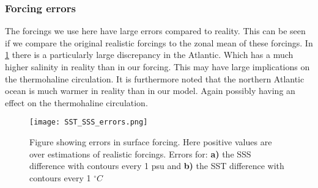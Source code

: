 \begin{multicols}{2}
 \subsubsection{Forcing errors} \label{sec:forc_err}
The forcings we use here have large errors compared to reality. This can be seen if we compare the original realistic forcings to the zonal mean of these forcings. In \cref{fig:sss_sst_errors} there is a particularly large discrepancy in the Atlantic. Which has a much higher salinity in reality than in our forcing. This may have large implications on the thermohaline circulation. It is furthermore noted that the northern Atlantic ocean is much warmer in reality than in our model. Again possibly having an effect on the thermohaline circulation.
\end{multicols}
\begin{figure}[H]
	\texttt{[image: SST\_SSS\_errors.png]}
	\caption{Figure showing errors in surface forcing. Here positive values are over estimations of realistic forcings. Errors for: \textbf{a)} the SSS difference with contours every 1 psu and \textbf{b)} the SST difference with contours every 1 $^{\circ}C$}
	\label{fig:sss_sst_errors}
\end{figure}
